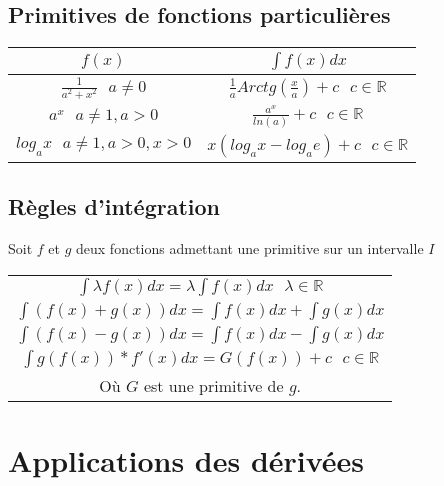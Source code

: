 \documentclass[12pt, a4paper]{book}
\begin{document}
\subsection{Primitives de fonctions particulières}
\begin{center}
    \begin{tabular}{|c|c|}
        \hline
       $f(x)$ & $\int f(x)dx$\\
        \hline
        $\frac{1}{a^2+x^2} \ \ \ a \not = 0$& $\frac{1}{a}Arctg(\frac{x}{a})+c \ \ \ c \in \mathbb{R}$\\
        $a^x \ \ \ a \not = 1, a>0$& $\frac{a^x}{ln(a)}+c \ \ \ c \in \mathbb{R}$\\
        $log_ax \ \ \ a \not = 1, a>0, x>0$& $x(log_ax-log_ae)+c \ \ \ c \in \mathbb{R}$\\
    
        \hline
    \end{tabular}
\end{center}
\newpage
\subsection{Règles d'intégration}
Soit $f$ et $g$ deux fonctions admettant une primitive sur un intervalle $I$
\begin{center}
    \begin{tabular}{|c|}
        \hline
        $\int \lambda f(x)dx = \lambda \int f(x)dx \ \ \ \lambda \in \mathbb{R}$\\
        $\int (f(x)+g(x))dx = \int f(x)dx + \int g(x)dx $\\
        $\int (f(x)-g(x))dx = \int f(x)dx - \int g(x)dx $\\
        $\int g(f(x))*f'(x)dx = G(f(x)) + c \ \ \ c \in \mathbb{R}$\\
        Où $G$ est une primitive de $g$.\\
        \hline
    \end{tabular}
\end{center}
\newpage
\section{Applications des dérivées}
\end{document}
